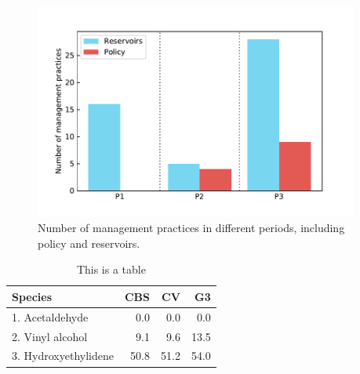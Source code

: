 \documentclass[9pt,twoside,lineno]{pnas-new}
\begin{document}
\begin{figure}
    \centering
    \includegraphics[width=0.95\textwidth]{../../figures/supplementary_information/managements.pdf}
    \caption{Number of management practices in different periods, including policy and reservoirs.}
\end{figure}



\begin{table}\centering
\caption{This is a table}

\begin{tabular}{lrrr}
Species & CBS & CV & G3 \\
\midrule
1. Acetaldehyde & 0.0 & 0.0 & 0.0 \\
2. Vinyl alcohol & 9.1 & 9.6 & 13.5 \\
3. Hydroxyethylidene & 50.8 & 51.2 & 54.0\\
\bottomrule
\end{tabular}
\end{table}




\FloatBarrier




\end{document}
